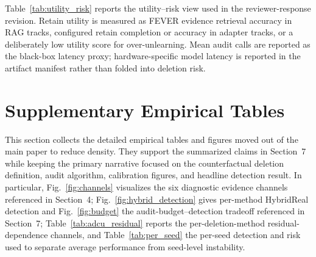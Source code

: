\documentclass[10pt,journal,compsoc]{IEEEtran}
\begin{document}
Table~\ref{tab:utility_risk} reports the utility--risk view used in the reviewer-response revision. Retain utility is measured as FEVER evidence retrieval accuracy in RAG tracks, configured retain completion or accuracy in adapter tracks, or a deliberately low utility score for over-unlearning. Mean audit calls are reported as the black-box latency proxy; hardware-specific model latency is reported in the artifact manifest rather than folded into deletion risk.

\section{Supplementary Empirical Tables}

This section collects the detailed empirical tables and figures moved out of the main paper to reduce density. They support the summarized claims in Section~7 while keeping the primary narrative focused on the counterfactual deletion definition, audit algorithm, calibration figures, and headline detection result. In particular, Fig.~\ref{fig:channels} visualizes the six diagnostic evidence channels referenced in Section~4; Fig.~\ref{fig:hybrid_detection} gives per-method HybridReal detection and Fig.~\ref{fig:budget} the audit-budget--detection tradeoff referenced in Section~7; Table~\ref{tab:adcu_residual} reports the per-deletion-method residual-dependence channels, and Table~\ref{tab:per_seed} the per-seed detection and risk used to separate average performance from seed-level instability.
\end{document}
